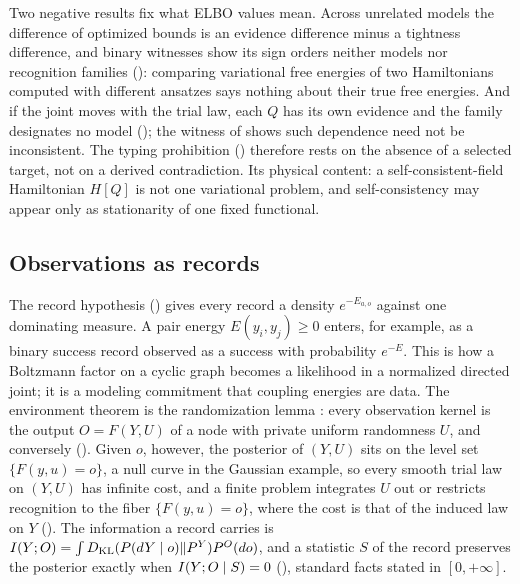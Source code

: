 Two negative results fix what ELBO values mean. Across unrelated models the difference of optimized bounds
is an evidence difference minus a tightness difference, and binary witnesses show its sign orders neither
models nor recognition families (): comparing variational free
energies of two Hamiltonians computed with different ansatzes says nothing about their true free energies.
And if the joint moves with the trial law, each $Q$ has its own evidence and the family designates no model
(); the witness of  shows such
dependence need not be inconsistent. The typing prohibition () therefore rests
on the absence of a selected target, not on a derived contradiction. Its physical content: a
self-consistent-field Hamiltonian $H[Q]$ is not one variational problem, and self-consistency may appear only
as stationarity of one fixed functional.

\subsection{Observations as records}
\label{comp:ch05-records}

The record hypothesis () gives every record a density $e^{-E_{a,o}}$
against one dominating measure. A pair energy $E(y_i,y_j)\geq0$ enters, for example, as a binary success
record observed as a success with probability $e^{-E}$. This is how a Boltzmann factor on a cyclic graph
becomes a likelihood in a normalized directed joint; it is a modeling commitment that coupling energies are
data. The environment theorem is the randomization lemma \citep{Kallenberg2021}: every observation kernel is
the output $O=F(Y,U)$ of a node with private uniform randomness $U$, and conversely
(). Given $o$, however, the posterior of $(Y,U)$ sits on the level set
$\{F(y,u)=o\}$, a null curve in the Gaussian example, so every smooth trial law on $(Y,U)$ has infinite cost, and
a finite problem integrates $U$ out or restricts recognition to the fiber $\{F(y,u)=o\}$, where the cost is that of the
induced law on $Y$ (). The information a record carries is
$I(Y;O)=\int D_{\mathrm{KL}}(P(dY\mid o)\Vert P^Y)P^O(do)$, and a statistic $S$ of the record preserves the posterior
exactly when $I(Y;O\mid S)=0$ (), standard facts \citep{CoverThomas2006}
stated in $[0,+\infty]$.

